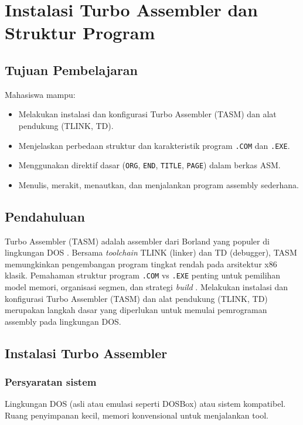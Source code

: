 \chapter{Instalasi Turbo Assembler dan Struktur Program}

\section{Tujuan Pembelajaran}
Mahasiswa mampu:
\begin{itemize}
    \item Melakukan instalasi dan konfigurasi Turbo Assembler (TASM) dan alat \\
    pendukung (TLINK, TD).
    \item Menjelaskan perbedaan struktur dan karakteristik program \texttt{.COM} dan \texttt{.EXE}.
    \item Menggunakan direktif dasar (\texttt{ORG}, \texttt{END}, \texttt{TITLE}, \texttt{PAGE}) dalam berkas ASM.
    \item Menulis, merakit, menautkan, dan menjalankan program assembly sederhana.
\end{itemize}

\section{Pendahuluan}
Turbo Assembler (TASM) adalah assembler dari Borland yang populer di lingkungan DOS \cite{borland1990tasm}. Bersama \textit{toolchain} TLINK (linker) dan TD (debugger), TASM memungkinkan pengembangan program tingkat rendah pada arsitektur x86 klasik. Pemahaman struktur program \texttt{.COM} vs \texttt{.EXE} penting untuk pemilihan model memori, organisasi segmen, dan strategi \textit{build} \cite{nopi2003tutorial}. Melakukan instalasi dan konfigurasi Turbo Assembler (TASM) dan alat pendukung (TLINK, TD) merupakan langkah dasar yang diperlukan untuk memulai pemrograman assembly pada lingkungan DOS.

\section{Instalasi Turbo Assembler}
\subsection{Persyaratan sistem}
Lingkungan DOS (asli atau emulasi seperti DOSBox) atau sistem kompatibel. Ruang penyimpanan kecil, memori konvensional untuk menjalankan tool.


